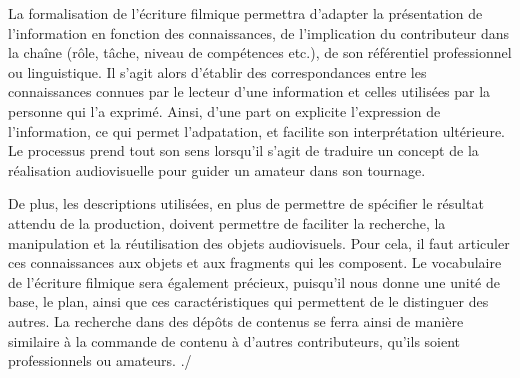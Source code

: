 La formalisation de l'écriture filmique permettra d'adapter la présentation de l'information en fonction des connaissances, de l'implication du contributeur dans la chaîne (rôle, tâche, niveau de compétences etc.), de son référentiel professionnel ou linguistique. 
Il s'agit alors d'établir des correspondances entre les connaissances connues par le lecteur d'une information et celles utilisées par la personne qui l'a exprimé.
Ainsi, d'une part on explicite l'expression de l'information, ce qui permet l'adpatation, et facilite son interprétation ultérieure.
Le processus prend tout son sens lorsqu'il s'agit de traduire un concept de la réalisation audiovisuelle pour guider un amateur dans son tournage.


De plus, les descriptions utilisées, en plus de permettre de spécifier le résultat attendu de la production, doivent permettre de faciliter la recherche, la manipulation et la réutilisation des objets audiovisuels.
Pour cela, il faut articuler ces connaissances aux objets et aux fragments qui les composent. 
Le vocabulaire de l'écriture filmique sera également précieux, puisqu'il nous donne une unité de base, le plan, ainsi que ces caractéristiques qui permettent de le distinguer des autres. 
La recherche dans des dépôts de contenus se ferra ainsi de manière similaire à la commande de contenu à d'autres contributeurs, qu'ils soient professionnels ou amateurs.
./








